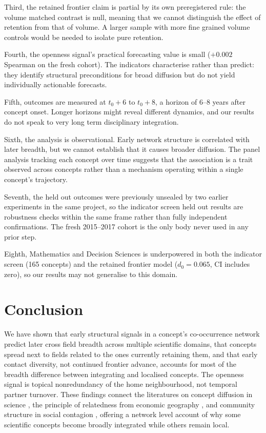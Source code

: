 \documentclass[11pt,letterpaper]{article}
\begin{document}
Third, the retained frontier claim is partial by its own preregistered rule:
the volume matched contrast is null, meaning that we cannot distinguish the
effect of retention from that of volume. A larger sample with more fine grained
volume controls would be needed to isolate pure retention.

Fourth, the openness signal's practical forecasting value is small ($+0.002$
Spearman on the fresh cohort). The indicators characterise rather than predict:
they identify structural preconditions for broad diffusion but do not yield
individually actionable forecasts.

Fifth, outcomes are measured at $t_0 + 6$ to $t_0 + 8$, a horizon of 6--8
years after concept onset. Longer horizons might reveal different dynamics, and
our results do not speak to very long term disciplinary integration.

Sixth, the analysis is observational. Early network structure is correlated with
later breadth, but we cannot establish that it causes broader diffusion. The
panel analysis tracking each concept over time suggests that the association is a
trait observed across concepts rather than a mechanism operating within a single
concept's trajectory.

Seventh, the held out outcomes were previously unsealed by two earlier
experiments in the same project, so the indicator screen held out results are
robustness checks within the same frame rather than fully independent
confirmations. The fresh 2015--2017 cohort is the only body never used in any
prior step.

Eighth, Mathematics and Decision Sciences is underpowered in both the indicator
screen (165 concepts) and the retained frontier model ($d_0 = 0.065$, CI
includes zero), so our results may not generalise to this domain.

\section{Conclusion}
\label{sec:conclusion}

We have shown that early structural signals in a concept's co-occurrence network
predict later cross field breadth across multiple scientific domains, that
concepts spread next to fields related to the ones currently retaining them, and
that early contact diversity, not continued frontier advance, accounts for most
of the breadth difference between integrating and localised concepts. The
openness signal is topical nonredundancy of the home neighbourhood, not
temporal partner turnover. These findings connect the literatures on concept
diffusion in science \citep{Cheng2023}, the principle of relatedness from
economic geography \citep{Hidalgo2007}, and community structure in social
contagion \citep{Weng2013, Ugander2012}, offering a network level account of
why some scientific concepts become broadly integrated while others remain local.



\end{document}
